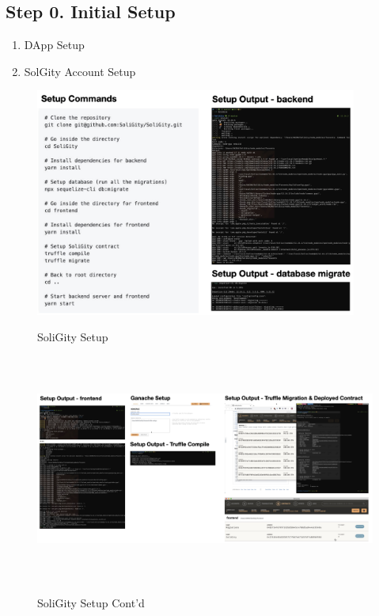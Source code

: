 \documentclass[12pt]{article}
\renewcommand{\_}{\kern-1.5pt\textunderscore\kern-1.5pt}
\begin{document}
\subsection*{Step 0. Initial Setup}
 \begin{enumerate}
   \item DApp Setup
   
   \item SolGity Account Setup
 \end{enumerate}


\begin{figure}[h]
	\centering
    \includegraphics[height=7.5cm]{graphs/46. setup_1.png}\\
	\caption{SoliGity Setup}
	\label{fig:setup1}
\end{figure}

\begin{figure}[h]
	\centering
    \includegraphics[height=7.5cm]{graphs/47. setup_2.png}\\
	\caption{SoliGity Setup Cont'd}
	\label{fig:setup1}
\end{figure}
\end{document}
